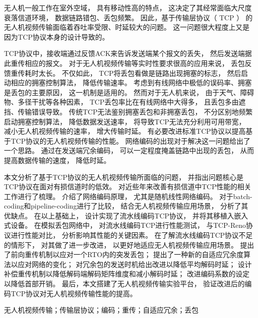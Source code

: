 \cabstract
{
	无人机一般工作在室外空域，
	具有移动性高的特点，
	这决定了其经常面临大尺度衰落信道环境，
	数据链路错包、丢包频繁。
	因此，基于传输层协议（ TCP ） 的无人机视频传输面临着吞吐率受限、时延较大的问题。
	这一问题很大程度上又是因为TCP协议本身的设计导致的。
	\par
	TCP协议中，接收端通过反馈ACK来告诉发送端某个报文的丢失，
	然后发送端据此重传相应的报文。
	对于无人机视频传输等实时性要求很高的应用来说，
	丢包反馈重传耗时太长。
	不仅如此，
	TCP将丢包看做是链路出现拥塞的标志，
	然后启动相应的拥塞控制算法，
	降低传输速率。
	考虑到有线网络中极低的误码率、拥塞是丢包的主要原因，
	这一机制是适用的。
	然而对于无人机来说，
	由于天气、障碍物、多径干扰等各种因素，
	TCP丢包率比在有线网络中大得多，
	且丢包多由遮挡、传输错误导致。
	传统TCP无法鉴别拥塞丢包和非拥塞丢包，
	不分区别地频繁启动拥塞控制算法，
	降低数据发送速率，
	将导致TCP无法充分利用可用带宽，
	减小无人机视频传输的速率，
	增大传输时延。
	有必要改进标准TCP协议以提高基于TCP协议的无人机视频传输的性能。
	网络编码的出现对于解决这一问题给出了一个思路。
	通过在发送端冗余编码，
	可以一定程度掩盖链路中出现的丢包，
	从而提高数据传输的速度，
	降低时延。
	\par
	本文分析了基于TCP协议的无人机视频传输所面临的问题，
	并指出问题核心是TCP协议在面对有损信道时的低效。
	对近些年来改善有损信道中TCP性能的相关工作进行了梳理。
	介绍了网络编码原理，
	尤其是随机线性网络编码。
	对于batch-coding和pipeline-coding进行了比较，
	结合无人机视频传输应用场景，
	分析了其优缺点。
	在以上基础上，
	设计实现了流水线编码TCP协议，
	并将其移植入嵌入式设备。
	在模拟丢包网络中，
	对流水线编码TCP进行性能测试，
	与TCP-Reno协议进行性能对比，
	分析影响其性能的关键因素。
	在了解流水线编码TCP协议不足的情形下，
	对其做了进一步改进，
	以更好地适应无人机视频传输应用场景。
	提出了前向重传机制以应对一个RTO内的突发丢包；
	提出了一种新的自适应冗余度算法以应对网络的变化；
	对冗余包的发送时机给出改进以降低平均解码时延；
	设计补偿重传机制以降低解码端解码矩阵维度和减小解码时延；
	改进编码系数的设定以降低首部开销。
	最后，本文搭建了无人机视频传输实验平台，
	验证改进后的编码TCP协议对无人机视频传输性能的提高。
	\par
	
}
{无人机视频传输；传输层协议；编码；重传；自适应冗余；丢包} 	%